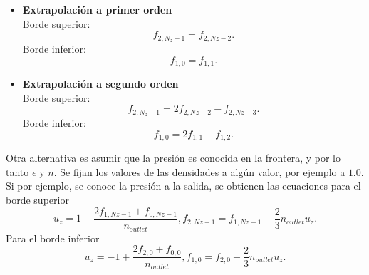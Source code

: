 \documentclass{article}
\begin{document}
\begin{itemize}
    \item \textbf{Extrapolación a primer orden}\\
    Borde superior: 
    \begin{equation}
        f_{2, N_z-1} = f_{2, Nz-2}.
    \end{equation}
    Borde inferior:
    \begin{equation}
        f_{1, 0} = f_{1, 1}.
    \end{equation} 
    
    \item \textbf{Extrapolación a segundo orden}\\
    Borde superior: 
    \begin{equation}
        f_{2, N_z-1} = 2f_{2, Nz-2}- f_{2, Nz-3}.
    \end{equation}
    Borde inferior:
    \begin{equation}
        f_{1, 0} = 2f_{1, 1}-f_{1, 2}.
    \end{equation} 
\end{itemize}
Otra alternativa es asumir que la presión es conocida en la frontera, y por lo tanto $\epsilon$ y $n$. Se fijan los valores de las densidades a algún valor, por ejemplo a $1.0$. Si por ejemplo, se conoce la presión a la salida, se obtienen las ecuaciones para el borde superior
\begin{subequations}
\begin{equation}
    u_z = 1 - \frac{2f_{1, Nz-1} + f_{0, Nz-1}}{n_{outlet}},
\end{equation}
\begin{equation}
    f_{2,Nz-1} = f_{1, Nz-1} - \frac{2}{3} n_{outlet}u_z.
\end{equation}
\end{subequations}
Para el borde inferior
\begin{subequations}
\begin{equation}
    u_z = -1 + \frac{2f_{2,0} + f_{0,0}}{n_{outlet}},
\end{equation}
\begin{equation}
    f_{1,0} = f_{2,0} - \frac{2}{3} n_{outlet}u_z.
\end{equation}
\end{subequations}
\end{document}
